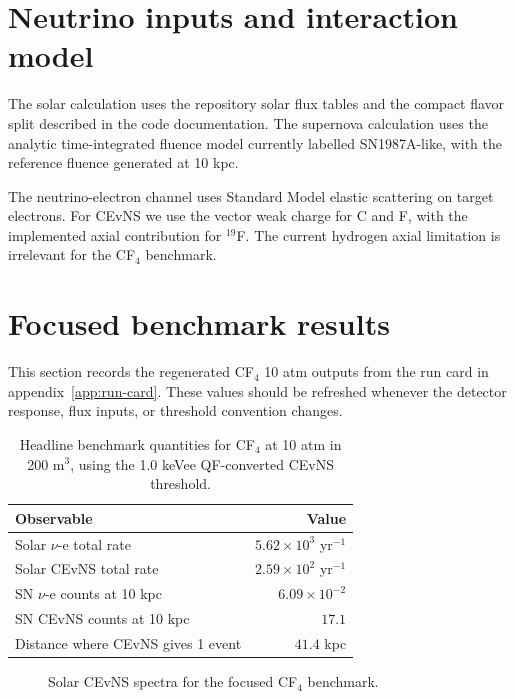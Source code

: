 \documentclass[a4paper,11pt]{article}
\begin{document}
\section{Neutrino inputs and interaction model}
\label{sec:model}

The solar calculation uses the repository solar flux tables and the compact
flavor split described in the code documentation. The supernova calculation
uses the analytic time-integrated fluence model currently labelled
SN1987A-like, with the reference fluence generated at 10 kpc.

The neutrino-electron channel uses Standard Model elastic scattering on target
electrons. For CEvNS we use the vector weak charge for C and F, with the
implemented axial contribution for $^{19}$F. The current hydrogen axial
limitation is irrelevant for the CF$_4$ benchmark.

\section{Focused benchmark results}
\label{sec:results}

This section records the regenerated CF$_4$ 10 atm outputs from the run card in
appendix~\ref{app:run-card}. These values should be refreshed whenever the
detector response, flux inputs, or threshold convention changes.

\begin{table}[htbp]
\centering
\begin{tabular}{lr}
\hline
Observable & Value \\
\hline
Solar $\nu$-e total rate & $5.62 \times 10^3$ yr$^{-1}$ \\
Solar CEvNS total rate & $2.59 \times 10^2$ yr$^{-1}$ \\
SN $\nu$-e counts at 10 kpc & $6.09 \times 10^{-2}$ \\
SN CEvNS counts at 10 kpc & $17.1$ \\
Distance where CEvNS gives 1 event & $41.4$ kpc \\
\hline
\end{tabular}
\caption{Headline benchmark quantities for CF$_4$ at 10 atm in 200 m$^3$,
using the 1.0 keVee QF-converted CEvNS threshold.}
\label{tab:headline}
\end{table}

\begin{figure}[htbp]
\centering
{}
\caption{Solar CEvNS spectra for the focused CF$_4$ benchmark.}
\label{fig:solar-cevns}
\end{figure}
\end{document}
